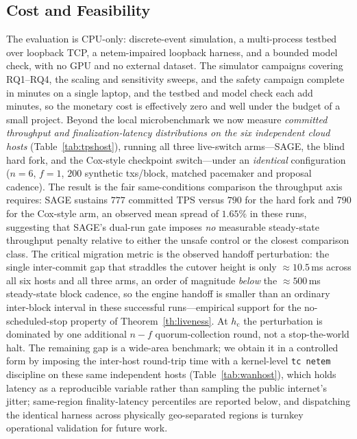 \documentclass[journal]{IEEEtran}
\theoremstyle{definition}
\theoremstyle{remark}
\begin{document}
\subsection{Cost and Feasibility}
The evaluation is CPU-only: discrete-event simulation, a multi-process testbed over
loopback TCP, a netem-impaired loopback harness, and a bounded model check, with no GPU and no
external dataset. The simulator campaigns covering RQ1--RQ4, the scaling and sensitivity sweeps,
and the safety campaign complete in minutes on a single laptop, and the testbed and model check
each add minutes, so the monetary cost is effectively zero and well under the budget of a small
project. Beyond the local microbenchmark we now measure \emph{committed throughput and
finalization-latency distributions on the six independent cloud hosts} (Table~\ref{tab:tpshost}),
running all three live-switch arms---SAGE, the blind hard fork, and the Cox-style checkpoint
switch---under an \emph{identical} configuration ($n{=}6$, $f{=}1$, $200$ synthetic txs/block,
matched pacemaker and proposal cadence). The result is the fair same-conditions comparison the
throughput axis requires: SAGE sustains $777$ committed TPS versus $790$ for the hard fork and
$790$ for the Cox-style arm, an observed mean spread of $1.65\%$ in these runs, suggesting that SAGE's dual-run gate imposes \emph{no} measurable steady-state
throughput penalty relative to either the unsafe control or the closest comparison class. The critical
migration metric is the observed handoff perturbation: the single inter-commit gap that straddles
the cutover height is only $\approx 10.5$\,ms across all six hosts and all three arms, an order of
magnitude \emph{below} the $\approx 500$\,ms steady-state block cadence, so the engine handoff is
smaller than an ordinary inter-block interval in these successful runs---empirical support for the
no-scheduled-stop property of Theorem~\ref{th:liveness}. At $h_{\mathrm{c}}$ the perturbation is dominated
by one additional $n{-}f$ quorum-collection round, not a stop-the-world halt. The remaining gap is
a wide-area benchmark; we obtain it in a controlled form by imposing the inter-host round-trip
time with a kernel-level \texttt{tc netem} discipline on these same independent hosts
(Table~\ref{tab:wanhost}), which holds latency as a reproducible variable rather than sampling the
public internet's jitter; same-region finality-latency percentiles are reported below, and
dispatching the identical harness across physically geo-separated regions is turnkey operational
validation for future work.
\end{document}
